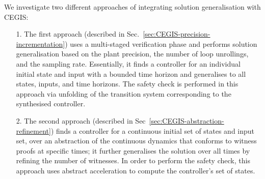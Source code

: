 \documentclass[runningheads,a4paper]{llncs}
\newcommand{\addtodo}[1]{{\color{red} TODO: #1}}
\begin{document}
We investigate two different approaches of integrating solution generalisation 
with CEGIS:
\begin{itemize}
\item[1.] The first approach (described in Sec.~\ref{sec:CEGIS-precision-incrementation})
  uses a multi-staged verification phase and performs solution generalisation based on
the plant precision, the number of loop unrollings, 
and the sampling rate. Essentially, it finds a controller for an individual initial state
and input with a bounded time horizon and generalises to all states,
inputs, and time horizons. The safety check is performed in this approach 
via unfolding of the transition system corresponding to the synthesised controller.


\item[2.] The second approach (described in Sec~\ref{sec:CEGIS-abstraction-refinement})
  finds a controller for a continuous initial set of states and input
  set, over an abstraction of the continuous dynamics that conforms to
  witness proofs at specific times; it further generalises the
  solution over all times by refining the number of witnesses.  
  In order to perform the safety check, this approach uses abstract acceleration
  \cite{cattaruzza2015unbounded} to compute the controller's set of states. 
\end{itemize}





\end{document}

